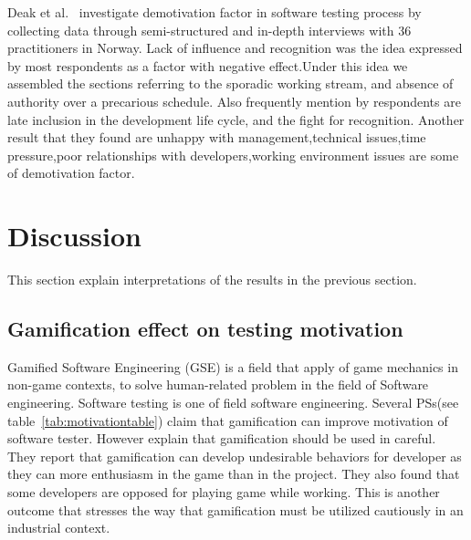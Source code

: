 \documentclass[conference, compsoc, twoside]{IEEEtran}
\begin{document}
Deak et al.~\cite{Deak2016} investigate demotivation factor in software testing process by collecting data through semi-structured and in-depth interviews with 36 practitioners in Norway. 
Lack of influence and recognition was the idea expressed by most respondents as a factor with negative effect.Under this idea we assembled the sections referring to the sporadic working stream, and absence of authority over a precarious schedule.
Also frequently mention by respondents are late inclusion in the development life cycle, and the fight for recognition.
Another result that they found are unhappy with management,technical issues,time pressure,poor relationships with developers,working environment issues are some of demotivation factor.

\section{Discussion}
This section explain interpretations of the results in the previous section.
\subsection{Gamification effect on testing motivation}
Gamified Software Engineering (GSE) is a field that apply of game mechanics in non-game contexts, to solve human-related problem in the field of Software engineering. Software testing is one of field software engineering. Several PSs(see table~\ref{tab:motivationtable}) claim that gamification can improve motivation of software tester. However \cite{Foucault20193731} explain that gamification should be used in careful. They report that gamification can develop undesirable behaviors for developer as they can more enthusiasm in the game than in the project. They also found that some developers are opposed for playing game while working. 
This is another outcome that stresses the way that gamification must be utilized cautiously in an industrial context.
\end{document}
